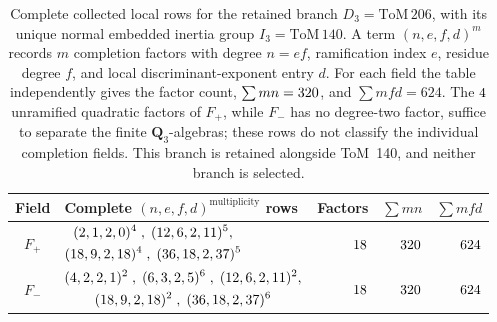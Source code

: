 \begin{table}[t]
  \centering
  \begingroup
  \small
  \setlength{\tabcolsep}{4pt}
  \renewcommand{\arraystretch}{1.16}
  \caption{Complete collected local rows for the retained branch
  \(D_3=\mathrm{ToM}\,206\), with its unique normal embedded inertia group
  \(I_3=\mathrm{ToM}\,140\).  A term \((n,e,f,d)^m\) records \(m\)
  completion factors with degree \(n=ef\), ramification index \(e\), residue
  degree \(f\), and local discriminant-exponent entry \(d\).  For each field the table
  independently gives the factor count, \(\sum mn=320\), and
  \(\sum mfd=624\).  The \(4\)
  unramified quadratic factors of \(F_+\), while \(F_-\) has no degree-two
  factor, suffice to separate the finite \(\mathbf Q_3\)-algebras; these rows do
  not classify the individual completion fields.  This branch is retained
  alongside ToM~140, and neither branch is selected.}
  \label{tab:c59-local-tom206}
  \begin{tabularx}{\textwidth}{@{}c >{\centering\arraybackslash}X rrr@{}}
    \toprule
    Field & Complete \((n,e,f,d)^{\mathrm{multiplicity}}\) rows
      & Factors & \(\sum mn\) & \(\sum mfd\) \\
    \midrule
    \(F_+\) & \(\CFTTomTwoZeroSixPlusRows\)
      & \(18\)
      & \(320\)
      & \(624\) \\
    \(F_-\) & \(\CFTTomTwoZeroSixMinusRows\)
      & \(18\)
      & \(320\)
      & \(624\) \\
    \bottomrule
  \end{tabularx}
  \endgroup
\end{table}
